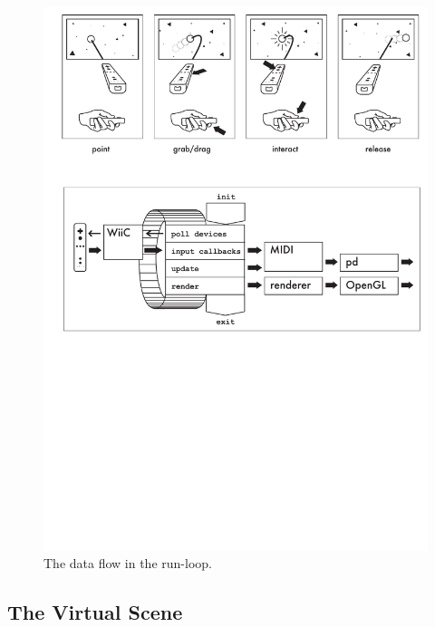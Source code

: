 \documentclass[10pt,a4paper]{scrartcl}
\begin{document}
\begin{figure}[hbtp]
\begin{center}
\includegraphics[width = 0.95 \columnwidth]{img/flow}
\caption{The data flow in the run-loop.}
\label{fig:flow}
\end{center}
\end{figure}



\subsection{The Virtual Scene}
\end{document}
